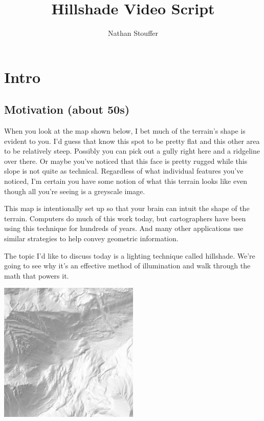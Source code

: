 \documentclass{article}
\newcommand\animation[1]{\textcolor{blue}{ANIMATION: #1}}
\begin{document}
	
\title{Hillshade Video Script}
\author{Nathan Stouffer}
\date{}
\maketitle

\section{Intro}

\subsection{Motivation (about 50s)}

When you look at the map shown below, I bet much of the terrain's shape is evident to you.
I'd guess that know this spot to be pretty flat and this other area to be relatively steep.
Possibly you can pick out a gully right here and a ridgeline over there.
Or maybe you've noticed that this face is pretty rugged while this slope is not quite as technical.
Regardless of what individual features you've noticed, I'm certain you have some notion of what this terrain looks like even though all you're seeing is a greyscale image.


This map is intentionally set up so that your brain can intuit the shape of the terrain.
Computers do much of this work today, but cartographers have been using this technique for hundreds of years.
And many other applications use similar strategies to help convey geometric information.

The topic I'd like to discuss today is a lighting technique called hillshade.
We're going to see why it's an effective method of illumination and walk through the math that powers it.

\begin{center}
	\includegraphics[width=0.5\textwidth,frame]{assets/hillshade-example.png}
\end{center}
\end{document}
